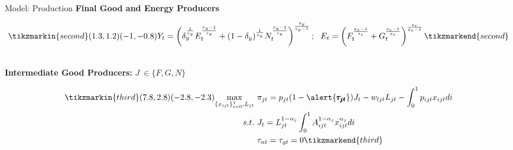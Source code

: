 \documentclass[11pt,aspectratio=169]{beamer}
\begin{document}
\begin{frame}{Model: Production}
\textbf{Final Good and Energy Producers }
\vspace{-5mm}
	\begin{minipage}[t!]{1\textwidth}
		\begin{align*}
		\tikzmarkin{second}(1.3,1.2)(-1,-0.8)
Y_t=\left(\delta_y^{\frac{1}{\varepsilon_y}}E_t^\frac{\varepsilon_y-1}{\varepsilon_y}+(1-\delta_y)^{\frac{1}{\varepsilon_y}}N_t^\frac{\varepsilon_y-1}{\varepsilon_y}\right)^\frac{\varepsilon_y}{\varepsilon_y-1}; \ \ 
E_t=\left({F}_t^\frac{\varepsilon_e-1}{\varepsilon_e}+G_t^\frac{\varepsilon_e-1}{\varepsilon_e}\right)^\frac{\varepsilon_e}{\varepsilon_e-1}
\tikzmarkend{second}
\end{align*}
	\end{minipage}
\pause
\\

\vspace{12mm}
\textbf{Intermediate Good Producers:} $J\ \in\{F,G,N\}$
	\vspace{-3mm}
\begin{minipage}[t!]{1\textwidth}
	\begin{align*}
	\tikzmarkin{third}(7.8,2.8)(-2.8,-2.3)
\underset{\{x_{ijt}\}_{i=0}^1, L_{jt}}{\max}\ & \pi_{jt}=p_{jt}(1-\alert{\pmb{\tau_{jt}}})J_t-w_{ljt}L_{jt}-\int_{0}^{1}p_{ijt}x_{ijt}di\\ 
 s.t.\ & J_{t}=L_{jt}^{1-\alpha_j}\int_{0}^{1}A^{1-\alpha_j}_{ijt}x_{ijt}^{\alpha_j}di \\
 \ & \tau_{nt}=\tau_{gt}=0
	\tikzmarkend{third}
	\end{align*}
\end{minipage}
\end{frame}
\end{document}
